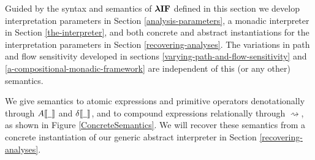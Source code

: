 \par

Guided by the syntax and semantics of $ \operatorname{\mathtt{\boldsymbol{\mathbf{\lambda{}IF}}}} $ defined
in this section we develop interpretation parameters in Section
\ref{analysis-parameters}, a monadic interpreter in Section
\ref{the-interpreter}, and both concrete and abstract instantiations for
the interpretation parameters in Section \ref{recovering-analyses}. The
variations in path and flow sensitivity developed in sections
\ref{varying-path-and-flow-sensitivity} and
\ref{a-compositional-monadic-framework} are independent of this (or any
other) semantics.

\par

We give semantics to atomic expressions and primitive operators
denotationally through
$A \llbracket  \underline{\hspace{0.5em}}  \rrbracket $ and
$ \delta  \llbracket  \underline{\hspace{0.5em}}  \rrbracket $, and to
compound expressions relationally through $ \rightsquigarrow $, as shown
in Figure \ref{ConcreteSemantics}. We will recover these semantics from
a concrete instantiation of our generic abstract interpreter in Section
\ref{recovering-analyses}.

\par

